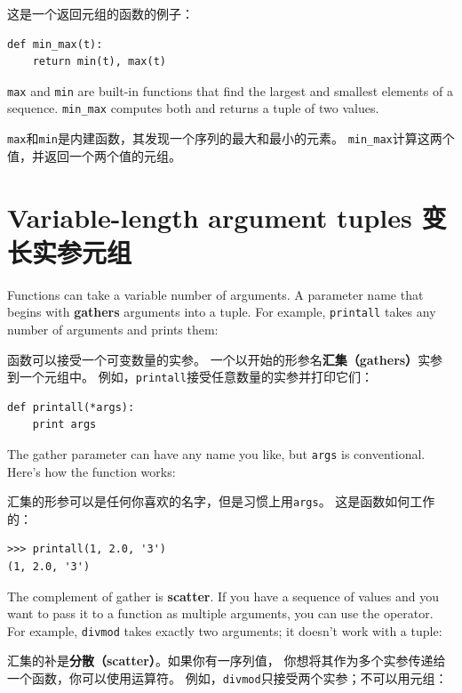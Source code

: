 \documentclass[10pt]{book}
\begin{document}
\begin{CJK}{UTF8}{gbsn}
这是一个返回元组的函数的例子：

\begin{verbatim}
def min_max(t):
    return min(t), max(t)
\end{verbatim}
%
{\tt max} and {\tt min} are built-in functions that find
the largest and smallest elements of a sequence.  \verb"min_max"
computes both and returns a tuple of two values.

{\tt max}和{\tt min}是内建函数，其发现一个序列的最大和最小的元素。
\verb"min_max"计算这两个值，并返回一个两个值的元组。


\section{Variable-length argument tuples 变长实参元组}

Functions can take a variable number of arguments.  A parameter
name that begins with {\tt *} {\bf gathers} arguments into
a tuple.  For example, {\tt printall}
takes any number of arguments and prints them:

函数可以接受一个可变数量的实参。
一个以{\tt *}开始的形参名{\bf 汇集（gathers）}实参到一个元组中。
例如，{\tt printall}接受任意数量的实参并打印它们：

\begin{verbatim}
def printall(*args):
    print args
\end{verbatim}
%
The gather parameter can have any name you like, but {\tt args} is
conventional.  Here's how the function works:

汇集的形参可以是任何你喜欢的名字，但是习惯上用{\tt args}。
这是函数如何工作的：

\begin{verbatim}
>>> printall(1, 2.0, '3')
(1, 2.0, '3')
\end{verbatim}
%
The complement of gather is {\bf scatter}.  If you have a
sequence of values and you want to pass it to a function
as multiple arguments, you can use the {\tt *} operator.
For example, {\tt divmod} takes exactly two arguments; it
doesn't work with a tuple:

汇集的补是{\bf 分散（scatter）}。如果你有一序列值，
你想将其作为多个实参传递给一个函数，你可以使用{\tt *}运算符。
例如，{\tt divmod}只接受两个实参；不可以用元组：


\end{CJK}
\end{document}

